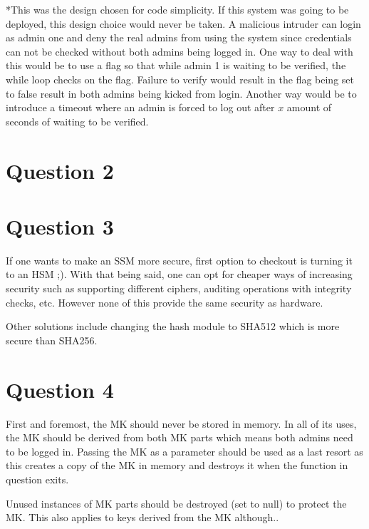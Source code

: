 \documentclass[a4paper, 12pt]{article}
\begin{document}
*This was the design chosen for code simplicity. If this system was going to be deployed, this design choice would never be taken. A malicious intruder can login as admin one and deny the real admins from using the system since credentials can not be checked without both admins being logged in.
One way to deal with this would be to use a flag so that while admin 1 is waiting to be verified, the while loop checks on the flag. Failure to verify would result in the flag being set to false result in both admins being kicked from login. Another way would be to introduce a timeout where an admin is forced to log out after $x$ amount of seconds of waiting to be verified.



\section{Question 2}
\section{Question 3}
If one wants to make an SSM more secure, first option to checkout is turning it to an HSM ;). With that being said, one can opt for cheaper ways of increasing security such as supporting different ciphers, auditing operations with integrity checks, etc. However none of this provide the same security as hardware.
\par
Other solutions include changing the hash module to SHA512 which is more secure than SHA256.

\section{Question 4}
First and foremost, the MK should never be stored in memory. In all of its uses, the MK should be derived from both MK parts which means both admins need to be logged in. Passing the MK as a parameter should be used as a last resort as this creates a copy of the MK in memory and destroys it when the function in question exits.
\par
Unused instances of MK parts should be destroyed (set to null) to protect the MK. This also applies to keys derived from the MK although..


 
\end{document}
